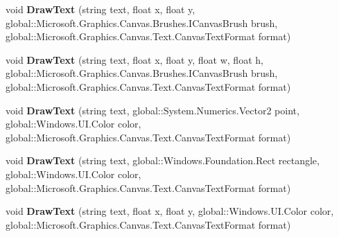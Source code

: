 \begin{DoxyCompactItemize}
\item 
\mbox{\label{class_microsoft_1_1_graphics_1_1_canvas_1_1_canvas_drawing_session_aa666e507bab764849c32dd4af7a48fc4}} 
void {\bfseries Draw\+Text} (string text, float x, float y, global\+::\+Microsoft.\+Graphics.\+Canvas.\+Brushes.\+I\+Canvas\+Brush brush, global\+::\+Microsoft.\+Graphics.\+Canvas.\+Text.\+Canvas\+Text\+Format format)
\item 
\mbox{\label{class_microsoft_1_1_graphics_1_1_canvas_1_1_canvas_drawing_session_ad6ba3b3276fd9ea0489400dc695da97a}} 
void {\bfseries Draw\+Text} (string text, float x, float y, float w, float h, global\+::\+Microsoft.\+Graphics.\+Canvas.\+Brushes.\+I\+Canvas\+Brush brush, global\+::\+Microsoft.\+Graphics.\+Canvas.\+Text.\+Canvas\+Text\+Format format)
\item 
\mbox{\label{class_microsoft_1_1_graphics_1_1_canvas_1_1_canvas_drawing_session_a128a0fb083f9d7b12d6d62fae20e6f5d}} 
void {\bfseries Draw\+Text} (string text, global\+::\+System.\+Numerics.\+Vector2 point, global\+::\+Windows.\+U\+I.\+Color color, global\+::\+Microsoft.\+Graphics.\+Canvas.\+Text.\+Canvas\+Text\+Format format)
\item 
\mbox{\label{class_microsoft_1_1_graphics_1_1_canvas_1_1_canvas_drawing_session_a63c809e2423b4b16f9c5960469c7dab6}} 
void {\bfseries Draw\+Text} (string text, global\+::\+Windows.\+Foundation.\+Rect rectangle, global\+::\+Windows.\+U\+I.\+Color color, global\+::\+Microsoft.\+Graphics.\+Canvas.\+Text.\+Canvas\+Text\+Format format)
\item 
\mbox{\label{class_microsoft_1_1_graphics_1_1_canvas_1_1_canvas_drawing_session_a80bd975d84b015fd135219935b6fbfe2}} 
void {\bfseries Draw\+Text} (string text, float x, float y, global\+::\+Windows.\+U\+I.\+Color color, global\+::\+Microsoft.\+Graphics.\+Canvas.\+Text.\+Canvas\+Text\+Format format)
\item 
\mbox{\label{class_microsoft_1_1_graphics_1_1_canvas_1_1_canvas_drawing_session_ad80cc677d80a65650773d85f71d12ef5}} 

\end{DoxyCompactItemize}
